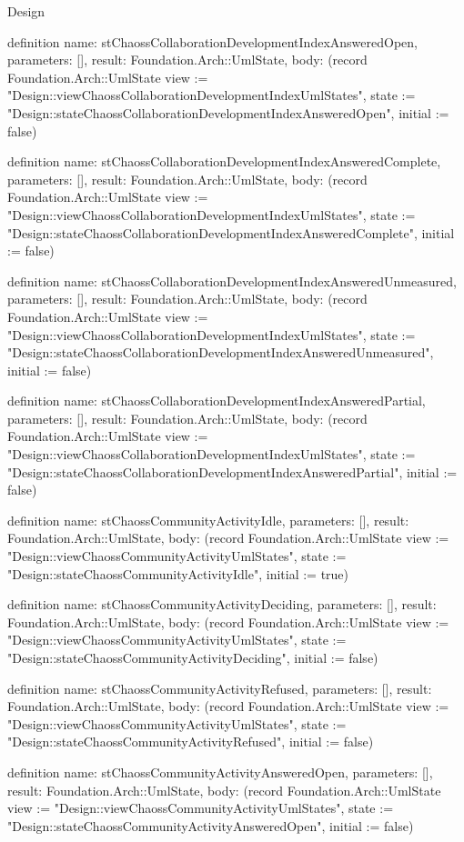 \begin{lexlean}{Design}
\begin{semanticmodule}
definition{
  name: stChaossCollaborationDevelopmentIndexAnsweredOpen,
  parameters: [],
  result: Foundation.Arch::UmlState,
  body: (record Foundation.Arch::UmlState {view := "Design::viewChaossCollaborationDevelopmentIndexUmlStates", state := "Design::stateChaossCollaborationDevelopmentIndexAnsweredOpen", initial := false})
}

definition{
  name: stChaossCollaborationDevelopmentIndexAnsweredComplete,
  parameters: [],
  result: Foundation.Arch::UmlState,
  body: (record Foundation.Arch::UmlState {view := "Design::viewChaossCollaborationDevelopmentIndexUmlStates", state := "Design::stateChaossCollaborationDevelopmentIndexAnsweredComplete", initial := false})
}

definition{
  name: stChaossCollaborationDevelopmentIndexAnsweredUnmeasured,
  parameters: [],
  result: Foundation.Arch::UmlState,
  body: (record Foundation.Arch::UmlState {view := "Design::viewChaossCollaborationDevelopmentIndexUmlStates", state := "Design::stateChaossCollaborationDevelopmentIndexAnsweredUnmeasured", initial := false})
}

definition{
  name: stChaossCollaborationDevelopmentIndexAnsweredPartial,
  parameters: [],
  result: Foundation.Arch::UmlState,
  body: (record Foundation.Arch::UmlState {view := "Design::viewChaossCollaborationDevelopmentIndexUmlStates", state := "Design::stateChaossCollaborationDevelopmentIndexAnsweredPartial", initial := false})
}

definition{
  name: stChaossCommunityActivityIdle,
  parameters: [],
  result: Foundation.Arch::UmlState,
  body: (record Foundation.Arch::UmlState {view := "Design::viewChaossCommunityActivityUmlStates", state := "Design::stateChaossCommunityActivityIdle", initial := true})
}

definition{
  name: stChaossCommunityActivityDeciding,
  parameters: [],
  result: Foundation.Arch::UmlState,
  body: (record Foundation.Arch::UmlState {view := "Design::viewChaossCommunityActivityUmlStates", state := "Design::stateChaossCommunityActivityDeciding", initial := false})
}

definition{
  name: stChaossCommunityActivityRefused,
  parameters: [],
  result: Foundation.Arch::UmlState,
  body: (record Foundation.Arch::UmlState {view := "Design::viewChaossCommunityActivityUmlStates", state := "Design::stateChaossCommunityActivityRefused", initial := false})
}

definition{
  name: stChaossCommunityActivityAnsweredOpen,
  parameters: [],
  result: Foundation.Arch::UmlState,
  body: (record Foundation.Arch::UmlState {view := "Design::viewChaossCommunityActivityUmlStates", state := "Design::stateChaossCommunityActivityAnsweredOpen", initial := false})
}


\end{semanticmodule}
\end{lexlean}
